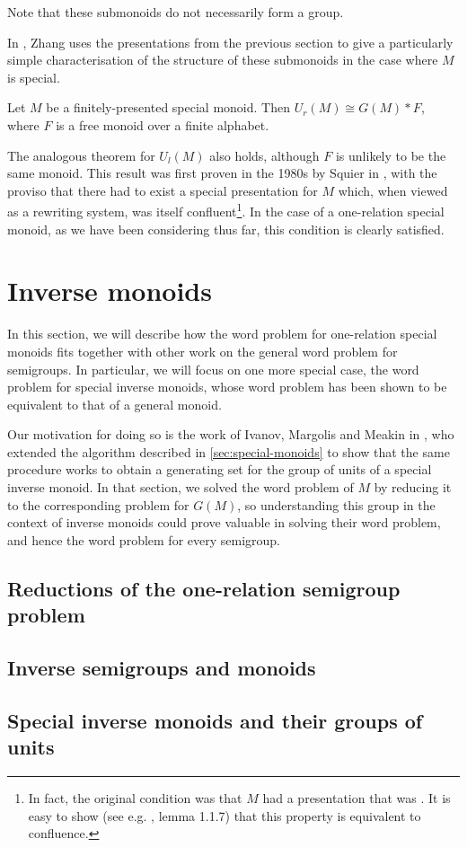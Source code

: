 \documentclass[noindex,noinsetproof,12pt]{lmaths}
\begin{document}
Note that these submonoids do not necessarily form a group.

In \cite{Zhang1992a}, Zhang uses the presentations from the previous section to give a particularly simple characterisation of the structure of these submonoids in the case where $M$ is special.
\begin{theorem}
	Let $M$ be a finitely-presented special monoid. Then $U_r(M) \cong G(M) \ast F$, where $F$ is a free monoid over a finite alphabet.
\end{theorem}

The analogous theorem for $U_l(M)$ also holds, although $F$ is unlikely to be the same monoid. This result was first proven in the 1980s by Squier in \cite{Squier1987}, with the proviso that there had to exist a special presentation for $M$ which, when viewed as a rewriting system, was itself confluent\footnote{In fact, the original condition was that $M$ had a presentation that was . It is easy to show (see e.g. \cite{Book1993}, lemma 1.1.7) that this property is equivalent to confluence.}. In the case of a one-relation special monoid, as we have been considering thus far, this condition is clearly satisfied.


\section{Inverse monoids}

In this section, we will describe how the word problem for one-relation special monoids fits together with other work on the general word problem for semigroups. In particular, we will focus on one more special case, the word problem for special inverse monoids, whose word problem has been shown to be equivalent to that of a general monoid.

Our motivation for doing so is the work of Ivanov, Margolis and Meakin in \cite{Ivanov2001}, who extended the algorithm described in \cref{sec:special-monoids} to show that the same procedure works to obtain a generating set for the group of units of a special inverse monoid. In that section, we solved the word problem of $M$ by reducing it to the corresponding problem for $G(M)$, so understanding this group in the context of inverse monoids could prove valuable in solving their word problem, and hence the word problem for every semigroup.

\subsection{Reductions of the one-relation semigroup problem}
\subsection{Inverse semigroups and monoids}
\subsection{Special inverse monoids and their groups of units}


\printbibliography

\printindex

\printincompleteproofs
\end{document}

